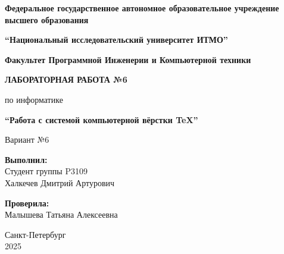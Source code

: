 
\begin{titlepage}
    \centering
    
    
    {\normalsize\textbf{Федеральное государственное автономное образовательное учреждение высшего образования}}
    
    \vspace{0.3cm}
    
    {\normalsize\textbf{``Национальный исследовательский университет ИТМО''}}
    
    \vspace{1cm}
    
    {\normalsize\textbf{Факультет Программной Инженерии и Компьютерной техники}}
    
    \vspace{2cm}
    
    {\large\textbf{ЛАБОРАТОРНАЯ РАБОТА №6}}
    
    \vspace{0.5cm}
    
    {\Large по информатике}
    
    \vspace{0.5cm}
    
    {\large \textbf{``Работа с системой
компьютерной вёрстки \TeX''}}
    
    \vspace{1cm}
    
    {\large Вариант №6}
    
    \vspace{5cm}
    
    \begin{flushright}
            {\large \textbf{Выполнил:}} \\
            Студент группы P3109 \\
            Халкечев Дмитрий Артурович
    \end{flushright}
    
    \vspace{0.5cm}
    
    \begin{flushright}
            {\large \textbf{Проверила:}} \\
            Малышева Татьяна Алексеевна
    \end{flushright}
    
    \vfill
    
    {\large Санкт-Петербург \\ 2025}
    
\end{titlepage}
